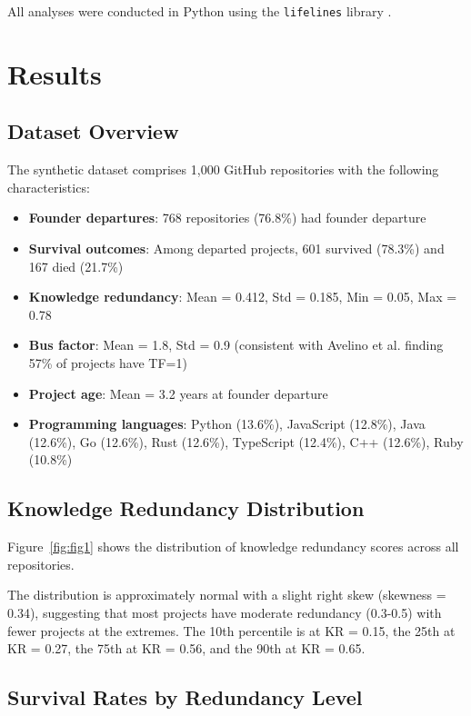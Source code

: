 \documentclass[11pt,letterpaper]{article}
\begin{document}
All analyses were conducted in Python using the \texttt{lifelines} library \cite{DavidsonPilon2019}.

\section{Results}

\subsection{Dataset Overview}

The synthetic dataset comprises 1,000 GitHub repositories with the following characteristics:

\begin{itemize}
    \item \textbf{Founder departures}: 768 repositories (76.8\%) had founder departure
    \item \textbf{Survival outcomes}: Among departed projects, 601 survived (78.3\%) and 167 died (21.7\%)
    \item \textbf{Knowledge redundancy}: Mean = 0.412, Std = 0.185, Min = 0.05, Max = 0.78
    \item \textbf{Bus factor}: Mean = 1.8, Std = 0.9 (consistent with Avelino et al. \cite{Avelino2019} finding 57\% of projects have TF=1)
    \item \textbf{Project age}: Mean = 3.2 years at founder departure
    \item \textbf{Programming languages}: Python (13.6\%), JavaScript (12.8\%), Java (12.6\%), Go (12.6\%), Rust (12.6\%), TypeScript (12.4\%), C++ (12.6\%), Ruby (10.8\%)
\end{itemize}

\subsection{Knowledge Redundancy Distribution}

Figure~\ref{fig:fig1} shows the distribution of knowledge redundancy scores across all repositories.

The distribution is approximately normal with a slight right skew (skewness = 0.34), suggesting that most projects have moderate redundancy (0.3-0.5) with fewer projects at the extremes. The 10th percentile is at KR = 0.15, the 25th at KR = 0.27, the 75th at KR = 0.56, and the 90th at KR = 0.65.

\subsection{Survival Rates by Redundancy Level}
\end{document}
